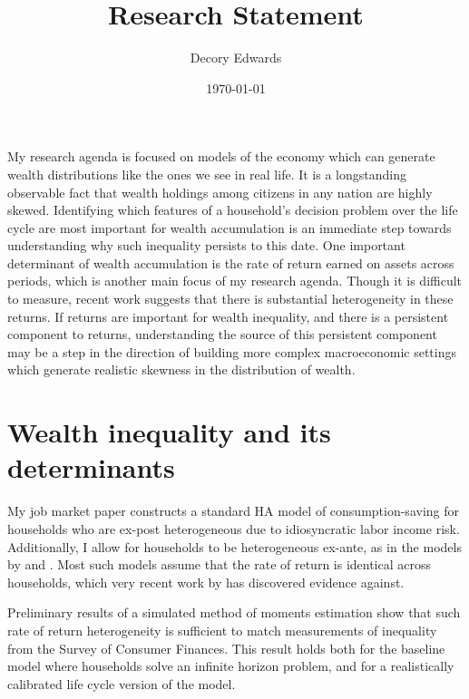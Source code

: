 \documentclass{scrartcl}
\title{Research Statement}
\author{Decory Edwards}
\date{\today}  %
\begin{document}
\maketitle

%  

My research agenda is focused on models of the economy which can generate wealth distributions like the ones we see in real life. It is a longstanding observable fact that wealth holdings among citizens in any nation are highly skewed. Identifying which features of a household's decision problem over the life cycle are most important for wealth accumulation is an immediate step towards understanding why such inequality persists to this date. One important determinant of wealth accumulation is the rate of return earned on assets across periods, which is another main focus of my research agenda. Though it is difficult to measure, recent work suggests that there is substantial heterogeneity in these returns. If returns are important for wealth inequality, and there is a persistent component to returns, understanding the source of this persistent component may be a step in the direction of building more complex macroeconomic settings which generate realistic skewness in the distribution of wealth. 

\section{Wealth inequality and its determinants}

My job market paper constructs a standard HA model of consumption-saving for households who are ex-post heterogeneous due to idiosyncratic labor income risk. 
Additionally, I allow for households to be heterogeneous ex-ante, as in the models by \cite{gkgv22} and \cite{cstw2017}. 
Most such models assume that the rate of return is identical across households, which very recent work by \cite{aflgdmlp20} has discovered evidence against. 

Preliminary results of a simulated method of moments estimation show that such rate of return heterogeneity is sufficient to match measurements of inequality from the Survey of Consumer Finances.  This result holds both for the baseline model where households solve an infinite horizon problem, and for a realistically calibrated
life cycle version of the model.
\end{document}
